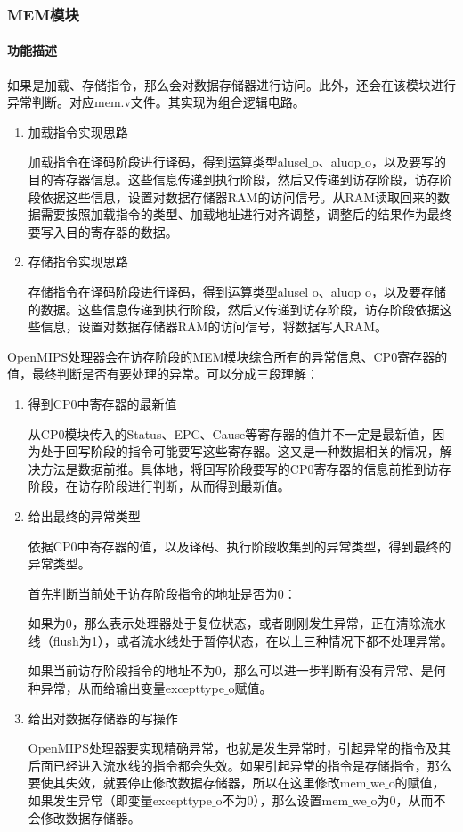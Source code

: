 \subsubsection{MEM模块}
\paragraph{功能描述}
\quad

\quad

如果是加载、存储指令，那么会对数据存储器进行访问。此外，还会在该模块进行异常判断。对应mem.v文件。其实现为组合逻辑电路。

\begin{enumerate}
	\item 加载指令实现思路
	
	加载指令在译码阶段进行译码，得到运算类型alusel$\_$o、aluop$\_$o，以及要写的目的寄存器信息。这些信息传递到执行阶段，然后又传递到访存阶段，访存阶段依据这些信息，设置对数据存储器RAM的访问信号。从RAM读取回来的数据需要按照加载指令的类型、加载地址进行对齐调整，调整后的结果作为最终要写入目的寄存器的数据。
	
	\item 存储指令实现思路
	
	存储指令在译码阶段进行译码，得到运算类型alusel$\_$o、aluop$\_$o，以及要存储的数据。这些信息传递到执行阶段，然后又传递到访存阶段，访存阶段依据这些信息，设置对数据存储器RAM的访问信号，将数据写入RAM。
\end{enumerate}

OpenMIPS处理器会在访存阶段的MEM模块综合所有的异常信息、CP0寄存器的值，最终判断是否有要处理的异常。可以分成三段理解：

\begin{enumerate}[(1)]
	\item 得到CP0中寄存器的最新值
	
	从CP0模块传入的Status、EPC、Cause等寄存器的值并不一定是最新值，因为处于回写阶段的指令可能要写这些寄存器。这又是一种数据相关的情况，解决方法是数据前推。具体地，将回写阶段要写的CP0寄存器的信息前推到访存阶段，在访存阶段进行判断，从而得到最新值。
	
	\item 给出最终的异常类型
	
	依据CP0中寄存器的值，以及译码、执行阶段收集到的异常类型，得到最终的异常类型。
	
	首先判断当前处于访存阶段指令的地址是否为0：
	
	如果为0，那么表示处理器处于复位状态，或者刚刚发生异常，正在清除流水线（flush为1），或者流水线处于暂停状态，在以上三种情况下都不处理异常。
	
	如果当前访存阶段指令的地址不为0，那么可以进一步判断有没有异常、是何种异常，从而给输出变量excepttype$\_$o赋值。
	
	\item 给出对数据存储器的写操作
	
	OpenMIPS处理器要实现精确异常，也就是发生异常时，引起异常的指令及其后面已经进入流水线的指令都会失效。如果引起异常的指令是存储指令，那么要使其失效，就要停止修改数据存储器，所以在这里修改mem$\_$we$\_$o的赋值，如果发生异常（即变量excepttype$\_$o不为0），那么设置mem$\_$we$\_$o为0，从而不会修改数据存储器。
\end{enumerate}

